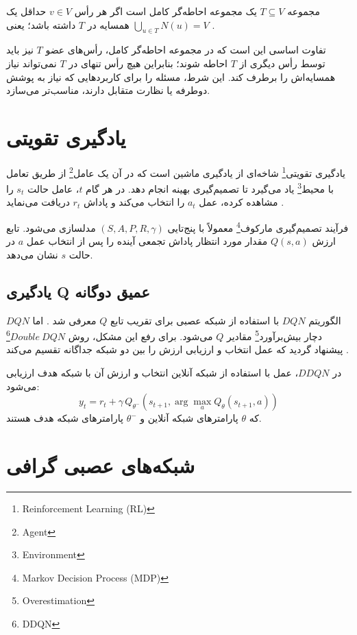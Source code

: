 \begin{definition}
مجموعه $T \subseteq V$ یک مجموعه احاطه‌گر کامل است اگر هر رأس $v \in V$ حداقل یک همسایه در $T$ داشته باشد؛ یعنی $\bigcup_{u\in T} N(u)=V$ \cite{haynes1998fundamentals}.
\end{definition}

تفاوت اساسی این است که در مجموعه احاطه‌گر کامل، رأس‌های عضو $T$ نیز باید توسط رأس دیگری از $T$ احاطه شوند؛ بنابراین هیچ رأس تنهای در $T$ نمی‌تواند نیاز همسایه‌اش را برطرف کند. این شرط، مسئله را برای کاربردهایی که نیاز به پوشش دوطرفه یا نظارت متقابل دارند، مناسب‌تر می‌سازد.

\section{یادگیری تقویتی}

یادگیری تقویتی\footnote{Reinforcement Learning (RL)} شاخه‌ای از یادگیری ماشین است که در آن یک عامل\footnote{Agent} از طریق تعامل با محیط\footnote{Environment} یاد می‌گیرد تا تصمیم‌گیری بهینه انجام دهد. در هر گام $t$، عامل حالت $s_t$ را مشاهده کرده، عمل $a_t$ را انتخاب می‌کند و پاداش $r_t$ دریافت می‌نماید \cite{sutton2018reinforcement}.

فرآیند تصمیم‌گیری مارکوف\footnote{Markov Decision Process (MDP)} معمولاً با پنج‌تایی $(S,A,P,R,\gamma)$ مدلسازی می‌شود. تابع ارزش $Q(s,a)$ مقدار مورد انتظار پاداش تجمعی آینده را پس از انتخاب عمل $a$ در حالت $s$ نشان می‌دهد.

\subsection{یادگیری Q عمیق دوگانه}

الگوریتم $DQN$ با استفاده از شبکه عصبی برای تقریب تابع $Q$ معرفی شد \cite{mnih2015human}. اما $DQN$ دچار بیش‌برآورد\footnote{Overestimation} مقادیر $Q$ می‌شود. برای رفع این مشکل، روش $Double\ DQN$\footnote{DDQN} پیشنهاد گردید که عمل انتخاب و ارزیابی ارزش را بین دو شبکه جداگانه تقسیم می‌کند \cite{vanhasselt2016ddqn}.

در $DDQN$، عمل با استفاده از شبکه آنلاین انتخاب و ارزش آن با شبکه هدف ارزیابی می‌شود:
$$
y_t = r_t + \gamma\, Q_{\theta^-}(s_{t+1}, \arg\max_a Q_\theta(s_{t+1},a))
$$
که $\theta$ پارامترهای شبکه آنلاین و $\theta^-$ پارامترهای شبکه هدف هستند.

\section{شبکه‌های عصبی گرافی}

